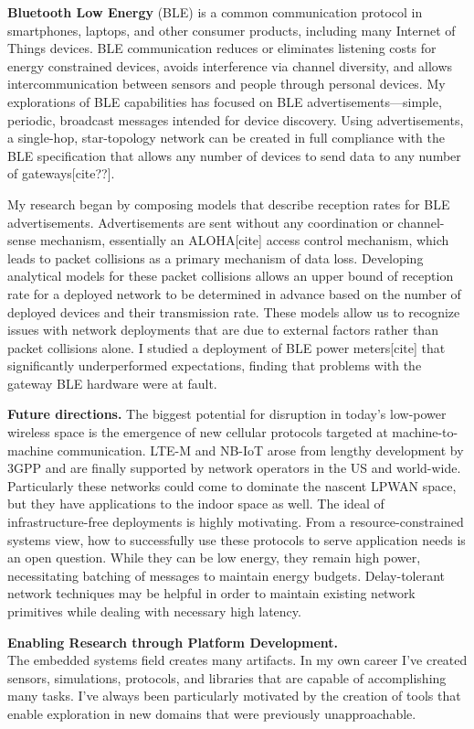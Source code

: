\documentclass[11pt]{article} %
\begin{document}
\textbf{Bluetooth Low Energy} (BLE) is a common communication protocol in smartphones,
laptops, and other consumer products, including many Internet of Things
devices. BLE communication reduces or eliminates listening costs for energy
constrained devices, avoids interference via channel diversity, and allows
intercommunication between sensors and people through personal devices. My
explorations of BLE capabilities has focused on BLE advertisements—simple,
periodic, broadcast messages intended for device discovery. Using
advertisements, a single-hop, star-topology network can be created in full
compliance with the BLE specification that allows any number of devices to send
data to any number of gateways[cite??].

My research began by composing models that describe reception rates for BLE
advertisements. Advertisements are sent without any coordination or
channel-sense mechanism, essentially an ALOHA[cite] access control mechanism,
which leads to packet collisions as a primary mechanism of data loss.
Developing analytical models for these packet collisions allows an upper bound
of reception rate for a deployed network to be determined in advance based on
the number of deployed devices and their transmission rate. These models allow
us to recognize issues with network deployments that are due to external
factors rather than packet collisions alone. I studied a deployment of BLE
power meters[cite] that significantly underperformed expectations, finding that
problems with the gateway BLE hardware were at fault.

\textbf{Future directions.} The biggest potential for disruption in today's low-power
wireless space is the emergence of new cellular protocols targeted at
machine-to-machine communication. LTE-M and NB-IoT arose from lengthy
development by 3GPP and are finally supported by network operators in the US
and world-wide. Particularly these networks could come to dominate the nascent
LPWAN space, but they have applications to the indoor space as well. The ideal
of infrastructure-free deployments is highly motivating. From a
resource-constrained systems view, how to successfully use these protocols to
serve application needs is an open question. While they can be low energy, they
remain high power, necessitating batching of messages to maintain energy
budgets. Delay-tolerant network techniques may be helpful in order to maintain
existing network primitives while dealing with necessary high latency.

\textbf{\textsf{\large Enabling Research through Platform Development.}}\\
The embedded systems field creates many artifacts. In my own career I've
created sensors, simulations, protocols, and libraries that are capable of
accomplishing many tasks. I've always been particularly motivated by the
creation of tools that enable exploration in new domains that were previously
unapproachable.
\end{document}
